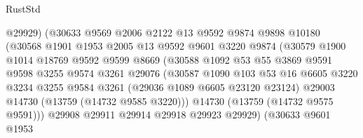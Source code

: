 \begin{lexlean}{RustStd}
\begin{coremodule}
                              @29929)
                            (@30633
                              @9569
                              @2006
                              @2122
                              @13
                              @9592
                              @9874
                              @9898
                              @10180
                              (@30568
                                @1901
                                @1953
                                @2005
                                @13
                                @9592
                                @9601
                                @3220
                                @9874
                                (@30579
                                  @1900
                                  @1014
                                  @18769
                                  @9592
                                  @9599
                                  @8669
                                  (@30588
                                    @1092
                                    @53
                                    @55
                                    @3869
                                    @9591
                                    @9598
                                    @3255
                                    @9574
                                    @3261
                                    @29076
                                    (@30587
                                      @1090
                                      @103
                                      @53
                                      @16
                                      @6605
                                      @3220
                                      @3234
                                      @3255
                                      @9584
                                      @3261
                                      (@29036 @1089 @6605 @23120 @23124)
                                      @29003
                                      @14730
                                      (@13759 (@14732 @9585 @3220)))
                                    @14730
                                    (@13759 (@14732 @9575 @9591)))
                                  @29908
                                  @29911
                                  @29914
                                  @29918
                                  @29923
                                  @29929)
                                (@30633
                                  @9601
                                  @1953

\end{coremodule}
\end{lexlean}
